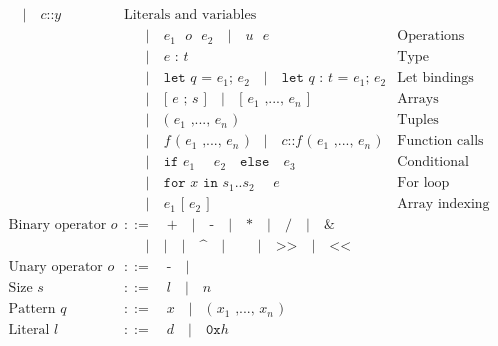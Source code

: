 \documentclass[10pt, english, a4paper]{article}
\newcommand{\rust}[1]{\texttt{#1}}
\begin{document}
\begin{align*}
                            \quad|\quad \rust{$c$::$y$}&\text{Literals and variables} \\
                            &\quad\;\;|\quad \rust{$e_1$ $o$ $e_2$}
                            \quad|\quad \rust{$u$ $e$}&\text{Operations} \\
                            &\quad\;\;|\quad \rust{$e$ : $t$}&\text{Type annotations} \\
                            &\quad\;\;|\quad \rust{let $q$ = $e_1$; $e_2$}
                            \quad|\quad \rust{let $q$ : $t$ = $e_1$; $e_2$}&\text{Let bindings} \\
                            &\quad\;\;|\quad \rust{[ $e$ ; $s$ ]}
                            \quad|\quad \rust{[ $e_1$ ,..., $e_n$ ]}&\text{Arrays} \\
                            &\quad\;\;|\quad \rust{( $e_1$ ,..., $e_n$ )}&\text{Tuples}\\
                            &\quad\;\;|\quad \rust{$f$ ( $e_1$ ,..., $e_n$ )}
                            \quad|\quad \rust{$c$::$f$ ( $e_1$ ,..., $e_n$ )}&\text{Function calls} \\
                            &\quad\;\;|\quad \rust{if $e_1$ { $e_2$ } else { $e_3$ } }&\text{Conditional}\\
                            &\quad\;\;|\quad \rust{for $x$ in $s_1$..$s_2$ { $e$ }}&\text{For loop}\\
                            &\quad\;\;|\quad \rust{$e_1$ [ $e_2$ ]}&\text{Array indexing} \\
\text{Binary operator }\rust{$o$}&::=\quad \rust{+}
                            \quad|\quad \rust{-}
                            \quad|\quad \rust{*}
                            \quad|\quad \rust{/}
                            \quad|\quad \rust{&}\\
                            &\quad\;\;|\quad \rust{|}
                            \quad|\quad \rust{^}
                            \quad|\quad \rust{~}
                            \quad|\quad \rust{>>}
                            \quad|\quad \rust{<<}
                            \\
\text{Unary operator }\rust{$o$}&::=\quad \rust{-}
                            \quad|\quad \rust{~}\\
\text{Size }\rust{$s$}&::=\quad \rust{$l$} \quad | \quad \rust{$n$}\\
\text{Pattern }\rust{$q$}&::=\quad \rust{$x$} \quad | \quad \rust{( $x_1$ ,..., $x_n$ )}\\
\text{Literal }\rust{$l$}&::=\quad \rust{$d$} \quad|\quad \rust{0x$h$}
\end{align*}
\end{document}
